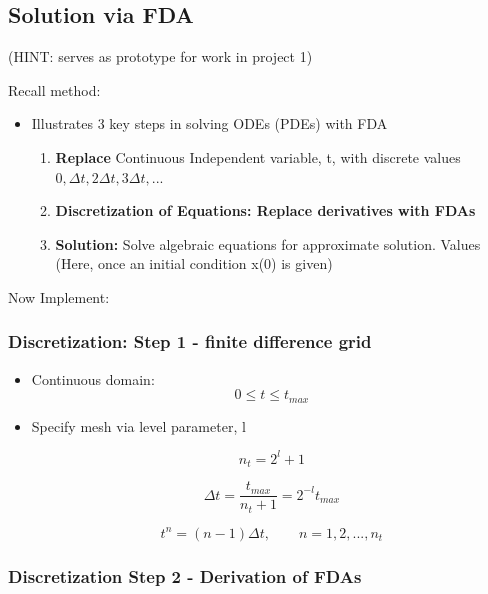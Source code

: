 \subsection{Solution via FDA}

(HINT: serves as prototype for work in project 1)

Recall method:

\begin{itemize}
    \item Illustrates 3 key steps in solving ODEs (PDEs) with FDA
    \begin{enumerate}
        \item \textbf{Replace} Continuous Independent variable, t, with discrete values $0,\Delta t, 2\Delta t, 3\Delta t, ...$
        \item \textbf{Discretization of Equations: Replace derivatives with FDAs}
        \item \textbf{Solution:} Solve algebraic equations for approximate solution. Values (Here, once an initial condition x(0) is given)
    \end{enumerate}
\end{itemize}

Now Implement:

\subsubsection{Discretization: Step 1 - finite difference grid}

\begin{itemize}


    \item Continuous domain:
    \[ 0 \leq t \leq t_{max}\]

    \item Specify mesh via level parameter, l

    \[ n_t = 2^l + 1 \]

    \[ \Delta t = \frac{t_{max}}{n_t+1} = 2^{-l}t_{max}\]

    \[ t^n = (n-1) \Delta t, \qquad n=1,2,..., n_t\]
\end{itemize}

\subsubsection{Discretization Step 2 - Derivation of FDAs}

